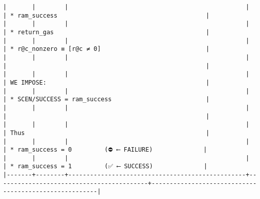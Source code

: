 \documentclass[varwidth=\maxdimen,margin=0.5cm,multi={verbatim}]{standalone}
\begin{document}
\begin{verbatim}
|       |        |                                                 |                                          | * ram_success                                         |
|       |        |                                                 |                                          | * return_gas                                          |
|       |        |                                                 |                                          | * r@c_nonzero ≡ [r@c ≠ 0]                             |
|       |        |                                                 |                                          |                                                       |
|       |        |                                                 |                                          | WE IMPOSE:                                            |
|       |        |                                                 |                                          | * SCEN/SUCCESS = ram_success                          |
|       |        |                                                 |                                          |                                                       |
|       |        |                                                 |                                          | Thus                                                  |
|       |        |                                                 |                                          | * ram_success = 0         (⛔ ⟵ FAILURE)              |
|       |        |                                                 |                                          | * ram_success = 1         (✅ ⟵ SUCCESS)              |
|-------+--------+-------------------------------------------------+------------------------------------------+-------------------------------------------------------|
\end{verbatim}
\end{document}

